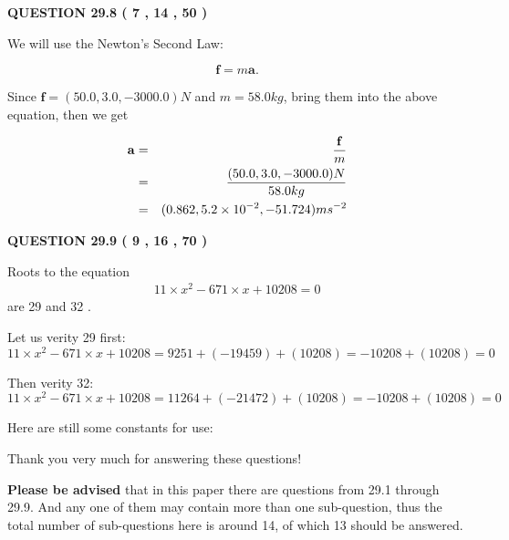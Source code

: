 \documentclass[12pt]{article}
\begin{document}
  
 
 

 
 
  
\vspace{0.2in}
  
{\textbf{\Large{QUESTION
29.8 
 (           7 ,          14 ,          50 )
}}}
  
  
 
 

We will use the Newton's Second Law:
 
\[
\mathbf{f}=m\mathbf{a}.
\]
 
Since $\mathbf{f}= %
(50.0 , 3.0 , -3000.0) N$
and $m= %
58.0kg$, bring them into the above equation, then we get
 
\begin{eqnarray*}
\mathbf{a}&=&\frac{\mathbf{f}}m  \\
&=&\frac{ %
(50.0 , 3.0 , -3000.0) N}{ %
58.0kg}  \\
&=& %
(0.862 , 5.2 \times 10^{-2} , -51.724) ms^{-2}
\end{eqnarray*}
 
 
 
  
\vspace{0.2in}
  
{\textbf{\Large{QUESTION
29.9 
 (           9 ,          16 ,          70 )
}}}
  
  


 
 

Roots to the equation
\begin{eqnarray*}
11 \times x^2  %
-671
                 \times x    %
+  %
10208 =0
\end{eqnarray*}
are  %
29 and  %
32 .
 
Let us verity  %
29 first:
$  %
11 \times x^2  %
-671
                 \times x    %
+  %
10208
  = %
9251+( %
-19459)+( %
10208)
  = %
-10208+( %
10208)
  = %
0
$
 
Then verity  %
32:
$  %
11 \times x^2  %
-671
                 \times x    %
+  %
10208
  = %
11264+( %
-21472)+( %
10208)
  = %
-10208+( %
10208)
  = %
0
$
 
 
 
   
   
 \vspace{0.2in}
Here are still some constants for use:
 
 
 
 
Thank you very much for answering these questions!
 
{\textbf{\large{Please be advised}}} that in this paper there are questions from
29.1 through
29.9.
And any one of them may contain more than one sub-question, thus the total number
of sub-questions here is around 14, of which
13 should be answered.
 
\end{document}
